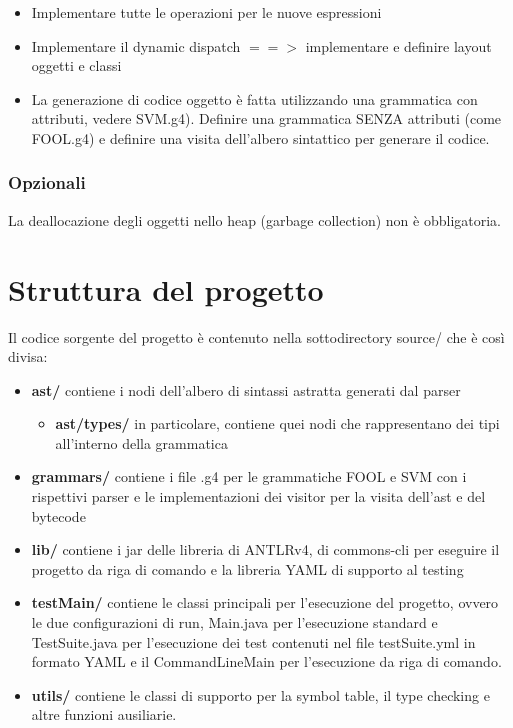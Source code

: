 \documentclass[a4paper]{article}   %
\begin{document}
\begin{itemize}
  \item Implementare tutte le operazioni per le nuove espressioni
  \item Implementare il dynamic dispatch $==>$ implementare e definire layout oggetti e classi
  \item La generazione di codice oggetto è fatta utilizzando una grammatica con attributi,
vedere SVM.g4).
Definire una grammatica SENZA attributi (come FOOL.g4) e definire una visita
dell'albero sintattico per generare il codice.
\end{itemize}

\subsubsection{Opzionali}

La deallocazione degli oggetti nello heap (garbage collection) non è obbligatoria.

\section{Struttura del progetto}

Il codice sorgente del progetto è contenuto nella sottodirectory source/ che è così divisa:

\begin{itemize}
  \item \textbf{ast/} contiene i nodi dell'albero di sintassi astratta generati dal parser
  \begin{itemize}
    \item \textbf{ast/types/}
    in particolare, contiene quei nodi che rappresentano dei tipi all'interno della grammatica
  \end{itemize}
  \item \textbf{grammars/}
    contiene i file .g4 per le grammatiche FOOL e SVM con i rispettivi parser e le implementazioni dei visitor per la visita dell'ast e del bytecode
  \item \textbf{lib/}
    contiene i jar delle libreria di ANTLRv4, di commons-cli per eseguire il progetto da riga di comando
    e la libreria YAML di supporto al testing
  \item \textbf{testMain/}
    contiene le classi principali per l'esecuzione del progetto, ovvero le
    due configurazioni di run, Main.java per l'esecuzione standard
    e TestSuite.java per l'esecuzione dei test contenuti nel file testSuite.yml in formato YAML e il CommandLineMain
    per l'esecuzione da riga di comando.
  \item \textbf{utils/}
    contiene le classi di supporto per la symbol table, il type checking e altre funzioni ausiliarie.

\end{itemize}
\end{document}
